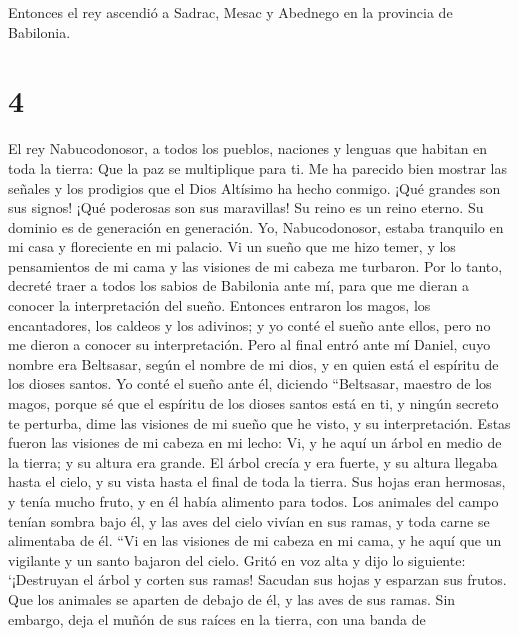  Entonces el rey ascendió a Sadrac, Mesac y Abednego en
la provincia de Babilonia.

\hypertarget{section-3}{%
\section{4}\label{section-3}}

 El rey Nabucodonosor, a todos los pueblos, naciones y
lenguas que habitan en toda la tierra: Que la paz se multiplique para
ti.  Me ha parecido bien mostrar las señales y los
prodigios que el Dios Altísimo ha hecho conmigo.  ¡Qué
grandes son sus signos! ¡Qué poderosas son sus maravillas! Su reino es
un reino eterno. Su dominio es de generación en generación.
 Yo, Nabucodonosor, estaba tranquilo en mi casa y
floreciente en mi palacio.  Vi un sueño que me hizo temer,
y los pensamientos de mi cama y las visiones de mi cabeza me turbaron.
 Por lo tanto, decreté traer a todos los sabios de
Babilonia ante mí, para que me dieran a conocer la interpretación del
sueño.  Entonces entraron los magos, los encantadores, los
caldeos y los adivinos; y yo conté el sueño ante ellos, pero no me
dieron a conocer su interpretación.  Pero al final entró
ante mí Daniel, cuyo nombre era Beltsasar, según el nombre de mi dios, y
en quien está el espíritu de los dioses santos. Yo conté el sueño ante
él, diciendo  ``Beltsasar, maestro de los magos, porque sé
que el espíritu de los dioses santos está en ti, y ningún secreto te
perturba, dime las visiones de mi sueño que he visto, y su
interpretación.  Estas fueron las visiones de mi cabeza
en mi lecho: Vi, y he aquí un árbol en medio de la tierra; y su altura
era grande.  El árbol crecía y era fuerte, y su altura
llegaba hasta el cielo, y su vista hasta el final de toda la tierra.
 Sus hojas eran hermosas, y tenía mucho fruto, y en él
había alimento para todos. Los animales del campo tenían sombra bajo él,
y las aves del cielo vivían en sus ramas, y toda carne se alimentaba de
él.  ``Vi en las visiones de mi cabeza en mi cama, y he
aquí que un vigilante y un santo bajaron del cielo. 
Gritó en voz alta y dijo lo siguiente: `¡Destruyan el árbol y corten sus
ramas! Sacudan sus hojas y esparzan sus frutos. Que los animales se
aparten de debajo de él, y las aves de sus ramas.  Sin
embargo, deja el muñón de sus raíces en la tierra, con una banda de
